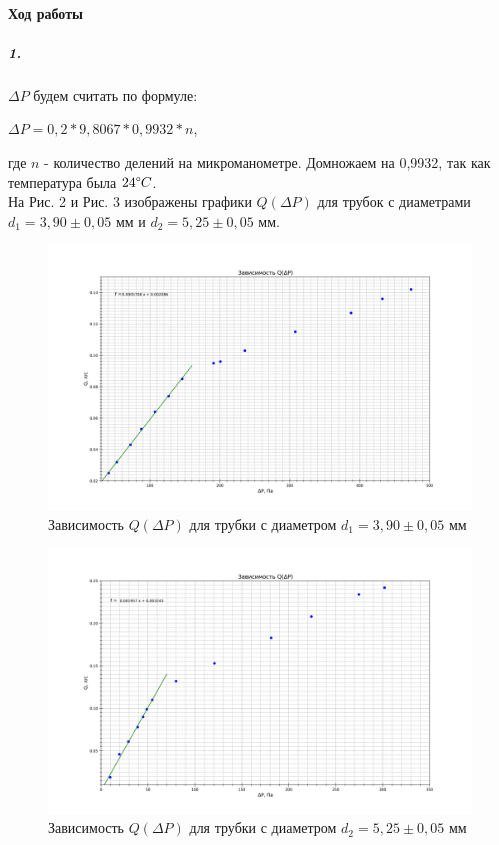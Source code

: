 \documentclass[a4paper,12pt]{article}
\begin{document}
\paragraph{Ход работы\\}
\subparagraph{1.} $\Delta P$ будем считать по формуле:
\begin{center}
    $\Delta P= 0,2 * 9,8067 * 0,9932 * n$,
\end{center}
где $n$ - количество делений на микроманометре. Домножаем на 0,9932, так как температура была $24\degree C$.\\
На Рис. 2 и Рис. 3 изображены графики $Q(\Delta P)$ для трубок с диаметрами $d_1=3,90\pm 0,05$ мм и $d_2=5,25\pm 0,05$ мм.
\begin{figure}[!h]
\centering
\includegraphics[width=1\linewidth]{QP1.png}
\caption{Зависимость $Q(\Delta P)$ для трубки с диаметром $d_1=3,90\pm 0,05$ мм}
\label{fig:mpr}
\end{figure}
\newpage
\begin{figure}[!h]
\centering
\includegraphics[width=1\linewidth]{QP2.png}
\caption{Зависимость $Q(\Delta P)$ для трубки с диаметром $d_2=5,25\pm 0,05$ мм}
\label{fig:mpr}
\end{figure}
\end{document}
